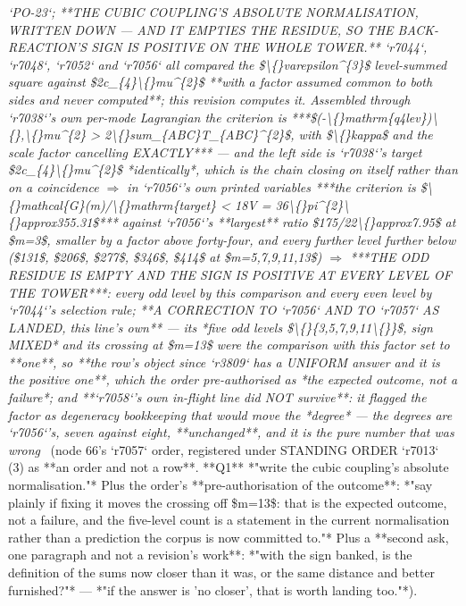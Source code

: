 \begin{description}
\textit{`PO-23`;  **THE CUBIC COUPLING'S ABSOLUTE NORMALISATION, WRITTEN DOWN --- AND IT EMPTIES THE RESIDUE, SO THE BACK-REACTION'S SIGN IS POSITIVE ON THE WHOLE TOWER.** `r7044`, `r7048`, `r7052` and `r7056` all compared the \$\textbackslash\{\}varepsilon\textasciicircum{}\{3\}\$ level-summed square against \$2c\_\{4\}\textbackslash\{\}mu\textasciicircum{}\{2\}\$ **with a factor assumed common to both sides and never computed**; this revision computes it. Assembled through `r7038`'s own per-mode Lagrangian the criterion is ***\$(-\textbackslash\{\}mathrm\{q4lev\})\textbackslash\{\},\textbackslash\{\}mu\textasciicircum{}\{2\} > 2\textbackslash\{\}sum\_\{ABC\}T\_\{ABC\}\textasciicircum{}\{2\}\$, with \$\textbackslash\{\}kappa\$ and the scale factor cancelling EXACTLY*** --- and the left side is `r7038`'s target \$2c\_\{4\}\textbackslash\{\}mu\textasciicircum{}\{2\}\$ *identically*, which is the chain closing on itself rather than on a coincidence \ensuremath{\Rightarrow} in `r7056`'s own printed variables ***the criterion is \$\textbackslash\{\}mathcal\{G\}(m)/\textbackslash\{\}mathrm\{target\} < 18V = 36\textbackslash\{\}pi\textasciicircum{}\{2\}\textbackslash\{\}approx355.31\$*** against `r7056`'s **largest** ratio \$175/22\textbackslash\{\}approx7.95\$ at \$m=3\$, smaller by a factor above forty-four, and every further level further below (\$131\$, \$206\$, \$277\$, \$346\$, \$414\$ at \$m=5,7,9,11,13\$) \ensuremath{\Rightarrow} ***THE ODD RESIDUE IS EMPTY AND THE SIGN IS POSITIVE AT EVERY LEVEL OF THE TOWER***: every odd level by this comparison and every even level by `r7044`'s selection rule;  **A CORRECTION TO `r7056` AND TO `r7057` AS LANDED, this line's own** --- its *five odd levels \$\textbackslash\{\}\{3,5,7,9,11\textbackslash\{\}\}\$, sign MIXED* and its crossing at \$m=13\$ were the comparison with this factor set to **one**, so **the row's object since `r3809` has a UNIFORM answer and it is the positive one**, which the order pre-authorised as *the expected outcome, not a failure*;  and **`r7058`'s own in-flight line did NOT survive**: it flagged the factor as degeneracy bookkeeping that would move the *degree* --- the degrees are `r7056`'s, seven against eight, **unchanged**, and it is the pure number that was wrong} \ (node 66's `r7057` order, registered under STANDING ORDER `r7013` (3) as **an order and not a row**. **Q1** *"write the cubic coupling's absolute normalisation."* Plus the order's **pre-authorisation of the outcome**: *"say plainly if fixing it moves the crossing off \$m=13\$: that is the expected outcome, not a failure, and the five-level count is a statement in the current normalisation rather than a prediction the corpus is now committed to."* Plus a **second ask, one paragraph and not a revision's work**: *"with the sign banked, is the definition of the sums now closer than it was, or the same distance and better furnished?"* --- *"if the answer is 'no closer', that is worth landing too."*). 

\end{description}
